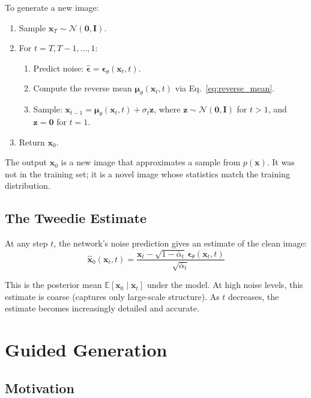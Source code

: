 \documentclass[11pt]{article}
\newcommand{\xb}{\mathbf{x}}
\newcommand{\zb}{\mathbf{z}}
\newcommand{\eb}{\boldsymbol{\epsilon}}
\newcommand{\Ib}{\mathbf{I}}
\newcommand{\E}{\mathbb{E}}
\newcommand{\alphabar}{\bar{\alpha}}
\begin{document}
  To generate a new image:
  \begin{enumerate}[nosep]
      \item Sample $\xb_T \sim \mathcal{N}(\mathbf{0}, \Ib)$.
      \item For $t = T, T{-}1, \ldots, 1$:
      \begin{enumerate}[nosep]
          \item Predict noise: $\hat{\eb} = \eb_\theta(\xb_t, t)$.
          \item Compute the reverse mean $\boldsymbol{\mu}_\theta(\xb_t, t)$
                via Eq.~\eqref{eq:reverse_mean}.
          \item Sample: $\xb_{t-1} = \boldsymbol{\mu}_\theta(\xb_t, t)
                + \sigma_t \zb$, where $\zb \sim \mathcal{N}(\mathbf{0}, \Ib)$
                for $t > 1$, and $\zb = \mathbf{0}$ for $t = 1$.
      \end{enumerate}
      \item Return $\xb_0$.
  \end{enumerate}

  The output $\xb_0$ is a new image that approximates a sample from $p(\xb)$.
  It was not in the training set; it is a novel image whose statistics match
  the training distribution.

  \subsection{The Tweedie Estimate}

  At any step $t$, the network's noise prediction gives an estimate of
  the clean image:
  \begin{equation}
      \hat{\xb}_0(\xb_t, t)
      = \frac{\xb_t - \sqrt{1 - \alphabar_t}\,
          \eb_\theta(\xb_t, t)}{\sqrt{\alphabar_t}}
      \label{eq:tweedie}
  \end{equation}

  This is the posterior mean $\E[\xb_0 \mid \xb_t]$ under the model.
  At high noise levels, this estimate is coarse (captures only large-scale
  structure). As $t$ decreases, the estimate becomes increasingly detailed
  and accurate.

  \section{Guided Generation}

  \subsection{Motivation}
\end{document}
